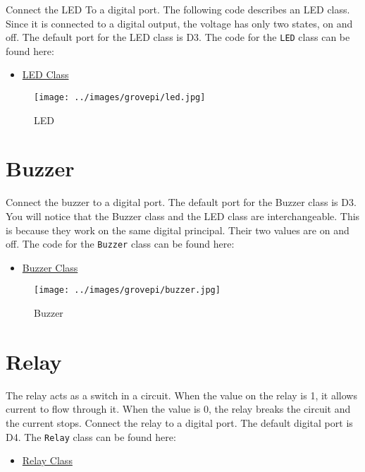 Connect the LED To a digital port. The following code describes an LED
class. Since it is connected to a digital output, the voltage has only
two states, on and off. The default port for the LED class is D3. The
code for the \texttt{LED} class can be found here:

\begin{itemize}

\item
  \href{https://github.com/cloudmesh/cloudmesh.pi/blob/master/cloudmesh/pi/led.py}{LED
  Class}
\end{itemize}

\begin{figure}
\centering
\texttt{[image: ../images/grovepi/led.jpg]}
\caption{LED}
\end{figure}

\section{Buzzer}\label{buzzer}

Connect the buzzer to a digital port. The default port for the Buzzer
class is D3. You will notice that the Buzzer class and the LED class are
interchangeable. This is because they work on the same digital
principal. Their two values are on and off. The code for the
\texttt{Buzzer} class can be found here:

\begin{itemize}

\item
  \href{https://github.com/cloudmesh/cloudmesh.pi/blob/master/cloudmesh/pi/buzzer.py}{Buzzer
  Class}
\end{itemize}

\begin{figure}
\centering
\texttt{[image: ../images/grovepi/buzzer.jpg]}
\caption{Buzzer}
\end{figure}

\section{Relay}\label{relay}

The relay acts as a switch in a circuit. When the value on the relay is
1, it allows current to flow through it. When the value is 0, the relay
breaks the circuit and the current stops. Connect the relay to a digital
port. The default digital port is D4. The \texttt{Relay} class can be
found here:

\begin{itemize}

\item
  \href{https://github.com/cloudmesh/cloudmesh.pi/blob/master/cloudmesh/pi/relay.py}{Relay
  Class}
\end{itemize}


